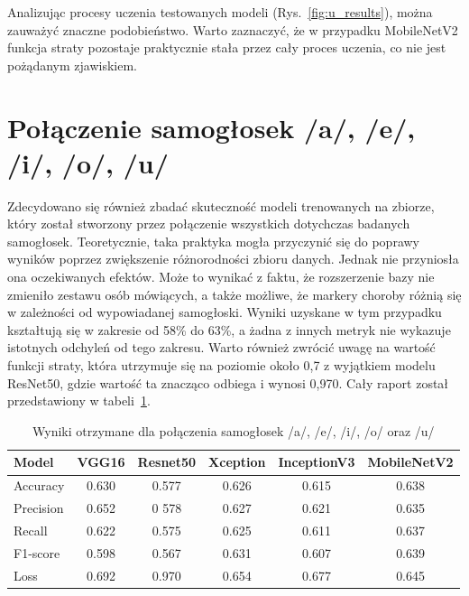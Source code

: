 Analizując procesy uczenia testowanych modeli (Rys.~\ref{fig:u_results}), można zauważyć znaczne podobieństwo.
Warto zaznaczyć, że w przypadku MobileNetV2 funkcja straty pozostaje praktycznie stała przez cały proces uczenia, co nie jest pożądanym zjawiskiem.

\section{Połączenie samogłosek /a/, /e/, /i/, /o/, /u/}
\label{sec:samogloski}


Zdecydowano się również zbadać skuteczność modeli trenowanych na zbiorze, który został stworzony przez połączenie wszystkich dotychczas badanych samogłosek.
Teoretycznie, taka praktyka mogła przyczynić się do poprawy wyników poprzez zwiększenie różnorodności zbioru danych.
Jednak nie przyniosła ona oczekiwanych efektów.
Może to wynikać z faktu, że rozszerzenie bazy nie zmieniło zestawu osób mówiących, a także możliwe, że markery choroby różnią się w zależności od wypowiadanej samogłoski.
Wyniki uzyskane w tym przypadku kształtują się w zakresie od 58\% do 63\%, a żadna z innych metryk nie wykazuje istotnych odchyleń od tego zakresu.
Warto również zwrócić uwagę na wartość funkcji straty, która utrzymuje się na poziomie około 0,7 z wyjątkiem modelu ResNet50, gdzie wartość ta znacząco odbiega i wynosi 0,970.
Cały raport został przedstawiony w tabeli~\ref{tab:wyniki-vowels}.

\begin{table}[ht]
\centering
\caption{Wyniki otrzymane dla połączenia samogłosek /a/, /e/, /i/, /o/ oraz /u/}
\label{tab:wyniki-vowels}
\begin{tabular}{|l|c|c|c|c|c|}
\hline
\textbf{Model} &\textbf{VGG16} &\textbf{Resnet50} &\textbf{Xception} &\textbf{InceptionV3} &\textbf{MobileNetV2} \\ \hline
    Accuracy &0.630 &0.577 &0.626 &0.615 &0.638 \\ \hline
    Precision &0.652 &0 578 &0.627 &0.621 &0.635 \\ \hline
    Recall &0.622 &0.575 &0.625 &0.611 &0.637 \\ \hline
    F1-score &0.598 &0.567 &0.631 &0.607 &0.639 \\ \hline
    Loss &0.692 &0.970 &0.654 &0.677 &0.645 \\ \hline
\end{tabular}
\end{table}

